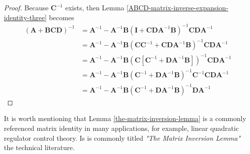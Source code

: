 \begin{proof}
Because $\mathbf{C}^{-1}$ exists, then Lemma \ref{ABCD-matrix-inverse-expansion-identity-three} becomes
\begin{equation*}
    \begin{aligned}
        \left( \mathbf{A} + \mathbf{B} \mathbf{C} \mathbf{D} \right)^{-1}
        &= \mathbf{A}^{-1} - \mathbf{A}^{-1} \mathbf{B} \left( \mathbf{I} + \mathbf{C} \mathbf{D} \mathbf{A}^{-1} \mathbf{B} \right)^{-1} \mathbf{C} \mathbf{D} \mathbf{A}^{-1} \\
        &= \mathbf{A}^{-1} - \mathbf{A}^{-1} \mathbf{B} \left( \mathbf{C} \mathbf{C}^{-1} + \mathbf{C} \mathbf{D} \mathbf{A}^{-1} \mathbf{B} \right)^{-1} \mathbf{C} \mathbf{D} \mathbf{A}^{-1} \\
        &= \mathbf{A}^{-1} - \mathbf{A}^{-1} \mathbf{B} \left( \mathbf{C} \left[ \mathbf{C}^{-1} + \mathbf{D} \mathbf{A}^{-1} \mathbf{B} \right] \right)^{-1} \mathbf{C} \mathbf{D} \mathbf{A}^{-1} \\
        &= \mathbf{A}^{-1} - \mathbf{A}^{-1} \mathbf{B} \left( \mathbf{C}^{-1} + \mathbf{D} \mathbf{A}^{-1} \mathbf{B} \right)^{-1} \mathbf{C}^{-1} \mathbf{C} \mathbf{D} \mathbf{A}^{-1} \\
        &= \mathbf{A}^{-1} - \mathbf{A}^{-1} \mathbf{B} \left( \mathbf{C}^{-1} + \mathbf{D} \mathbf{A}^{-1} \mathbf{B} \right)^{-1} \mathbf{D} \mathbf{A}^{-1}
    \end{aligned}
\end{equation*}
\end{proof}

It is worth mentioning that Lemma \ref{the-matrix-inversion-lemma} is a commonly
referenced matrix identity in many applications, for example, linear quadratic regulator
control theory. Is is commonly titled \textit{"The Matrix Inversion Lemma"} the technical literature.


